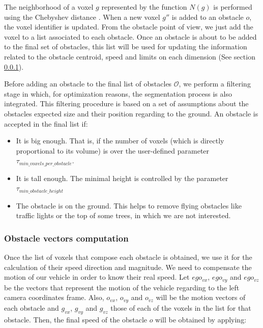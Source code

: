 The neighborhood of a voxel $g$ represented by the function $N(g)$ is performed using the Chebyshev distance \citep{broggi2013}. When a new voxel $g''$ is added to an obstacle $o$, the voxel identifier is updated. From the obstacle point of view, we just add the voxel to a list associated to each obstacle. Once an obstacle is about to be added to the final set of obstacles, this list will be used for updating the information related to the obstacle centroid, speed and limits on each dimension (See section \ref{ch:chapter05_01_05_01}).

Before adding an obstacle to the final list of obstacles $\mathcal{O}$, we perform a filtering stage in which, for optimization reasons, the segmentation process is also integrated. This filtering procedure is based on a set of assumptions about the obstacles expected size and their position regarding to the ground. An obstacle is accepted in the final list if:

\begin{itemize}
 \item It is big enough. That is, if the number of voxels (which is directly proportional to its volume) is over the user-defined parameter $\tau_{min\_voxels\_per\_obstacle}$.
 \item It is tall enough. The minimal height is controlled by the parameter\\ $\tau_{min\_obstacle\_height}$
 \item The obstacle is on the ground. This helps to remove flying obstacles like traffic lights or the top of some trees, in which we are not interested.
\end{itemize}

\subsubsection{Obstacle vectors computation}\label{ch:chapter05_01_05_01}

Once the list of voxels that compose each obstacle is obtained, we use it for the calculation of their speed direction and magnitude. We need to compensate the motion of our vehicle in order to know their real speed. Let $ego_{vx}$, $ego_{vy}$ and $ego_{vz}$ be the vectors that represent the motion of the vehicle regarding to the left camera coordinates frame. Also, $o_{vx}$, $o_{vy}$ and $o_{vz}$ will be the motion vectors of each obstacle and $g_{vx}$, $g_{vy}$ and $g_{vz}$ those of each of the voxels in the list for that obstacle. Then, the final speed of the obstacle $o$ will be obtained by applying:

